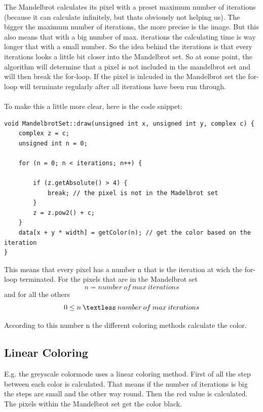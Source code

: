 \documentclass[final, paper=a4, paper=portrait, pagesize=auto, fontsize=10pt,english]{scrartcl}
\begin{document}
The Mandelbrot calculates its pixel with a preset maximum number of iterations (because it can calculate infinitely, but thats obviously not helping us). The bigger the maximum number of iterations, the more precise is the image. But this also means that with a big number of max. iterations the calculating time is way longer that with a small number. So the idea behind the iterations is that every iterations looks a little bit closer into the Mandelbrot set. So at some point, the algorithm will determine that a pixel is not included in the mandelbrot set and will then break the for-loop. If the pixel is inlcuded in the Mandelbrot set the for-loop will terminate regularly after all iterations have been run through.\\ \\ 
To make this a little more clear, here is the code snippet:\\

\begin{lstlisting}
void MandelbrotSet::draw(unsigned int x, unsigned int y, complex c) {
	complex z = c;
	unsigned int n = 0;

	for (n = 0; n < iterations; n++) {

		if (z.getAbsolute() > 4) {
			break; // the pixel is not in the Madelbrot set
		}
		z = z.pow2() + c;
	}
	data[x + y * width] = getColor(n); // get the color based on the iteration
}
\end{lstlisting}

This means that every pixel has a number n that is the iteration at wich the for-loop terminated.
For the pixels that are in the Mandelbrot set
\begin{displaymath} 
n = number \: of \: max \: iterations
\end{displaymath}
and for all the others
\begin{displaymath} 
0 \leq n  \: \textless \: number \: of \: max \: iterations
\end{displaymath}

According to this number n the different coloring methods calculate the color.

\subsection{Linear Coloring}
E.g. the greyscale colormode uses a linear coloring method. 
First of all the step between each color is calculated. That means if the number of iterations is big the steps are small and the other way round. Then the red value is calculated. The pixels within the Mandelbrot set get the color black.
\end{document}
